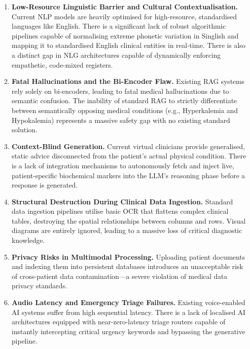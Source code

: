 \documentclass[12pt,a4paper]{report}
\begin{document}
\begin{enumerate}[label=\textbf{Gap \arabic*:}, leftmargin=*, align=left]

  \item \textbf{Low-Resource Linguistic Barrier and Cultural Contextualisation.}
  Current NLP models are heavily optimised for high-resource, standardised languages like English. There is a significant lack of robust algorithmic pipelines capable of normalising extreme phonetic variation in Singlish and mapping it to standardised English clinical entities in real-time. There is also a distinct gap in NLG architectures capable of dynamically enforcing empathetic, code-mixed registers.

  \item \textbf{Fatal Hallucinations and the Bi-Encoder Flaw.}
  Existing RAG systems rely solely on bi-encoders, leading to fatal medical hallucinations due to semantic confusion. The inability of standard RAG to strictly differentiate between semantically opposing medical conditions (e.g., Hyperkalemia and Hypokalemia) represents a massive safety gap with no existing standard solution.

  \item \textbf{Context-Blind Generation.}
  Current virtual clinicians provide generalised, static advice disconnected from the patient's actual physical condition. There is a lack of integration mechanisms to autonomously fetch and inject live, patient-specific biochemical markers into the LLM's reasoning phase before a response is generated.

  \item \textbf{Structural Destruction During Clinical Data Ingestion.}
  Standard data ingestion pipelines utilise basic OCR that flattens complex clinical tables, destroying the spatial relationships between columns and rows. Visual diagrams are entirely ignored, leading to a massive loss of critical diagnostic knowledge.

  \item \textbf{Privacy Risks in Multimodal Processing.}
  Uploading patient documents and indexing them into persistent databases introduces an unacceptable risk of cross-patient data contamination---a severe violation of medical data privacy standards.

  \item \textbf{Audio Latency and Emergency Triage Failures.}
  Existing voice-enabled AI systems suffer from high sequential latency. There is a lack of localised AI architectures equipped with near-zero-latency triage routers capable of instantly intercepting critical urgency keywords and bypassing the generative pipeline.

\end{enumerate}
\end{document}
